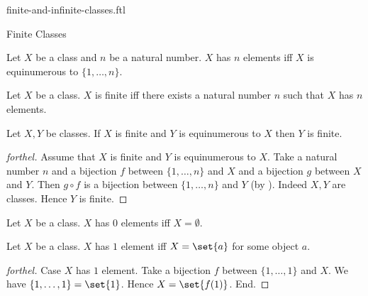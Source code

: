 \documentclass{naproche-library}
\begin{document}
\begin{smodule}[title=Finite and Infinite Classes]{finite-and-infinite-classes.ftl}

\begin{sfragment}{Finite Classes}
  \begin{definition}[forthel,id=FOUNDATIONS_14_3512046897512410]
    Let $X$ be a class and $n$ be a natural number.
    $X$ has $n$ elements iff $X$ is equinumerous to $\{ 1, \dots, n \}$.
  \end{definition}

  \begin{definition}[forthel,id=FOUNDATIONS_14_3694156977274880]
    Let $X$ be a class.
    $X$ is finite iff there exists a natural number $n$ such that $X$ has $n$ elements.
  \end{definition}

  \begin{proposition}[forthel,id=FOUNDATIONS_14_3929085203972096]
    Let $X, Y$ be classes.
    If $X$ is finite and $Y$ is equinumerous to $X$ then $Y$ is finite.
  \end{proposition}
  \begin{proof}[forthel]
    Assume that $X$ is finite and $Y$ is equinumerous to $X$.
    Take a natural number $n$ and a bijection $f$ between $\{ 1, \dots, n \}$ and $X$ and a bijection $g$ between $X$ and $Y$.
    Then $g \circ f$ is a bijection between $\{ 1, \dots, n \}$ and $Y$ (by ).
    Indeed $X, Y$ are classes.
    Hence $Y$ is finite.
  \end{proof}

  \begin{proposition}[forthel,id=FOUNDATIONS_14_5132547854597502]
    Let $X$ be a class.
    $X$ has $0$ elements iff $X = \emptyset$.
  \end{proposition}

  \begin{proposition}[forthel,id=FOUNDATIONS_14_6812054297034125]
    Let $X$ be a class.
    $X$ has $1$ element iff $X = \set{a}$ for some object $a$.
  \end{proposition}
  \begin{proof}[forthel]
    Case $X$ has $1$ element.
      Take a bijection $f$ between $\{ 1, \dots, 1 \}$ and $X$.
      We have $\{ 1, \dots, 1 \} = \set{1}$.
      Hence $X = \set{f(1)}$.
    End.


\end{proof}
\end{sfragment}
\end{smodule}
\end{document}
